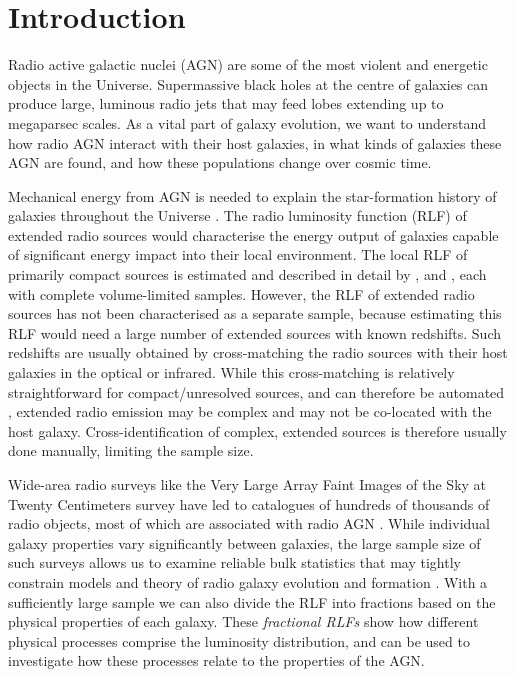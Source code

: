 \documentclass[11pt, a4paper]{book}
\newcommand{\defn}[1]{\emph{#1}}
\begin{document}
\section{Introduction} \label{sec:rlfs-intro}

Radio active galactic nuclei (AGN) are some of the most violent and energetic
objects in the Universe. Supermassive black holes at the centre of galaxies
can produce large, luminous radio jets that may feed lobes extending up to
megaparsec scales. As a vital part of galaxy evolution, we want to understand
how radio AGN interact with their host galaxies, in what kinds of galaxies
these AGN are found, and how these populations change over cosmic time.

Mechanical energy from AGN is needed to explain the star-formation history of galaxies throughout the Universe \citep[e.g.][]{raouf17agn,hardcastle20feedback}. The radio luminosity function (RLF) of extended radio sources would characterise the energy output of galaxies capable of significant energy impact into their local environment. The local RLF of primarily compact sources is estimated and
described in detail by \citet{mauch07rlf}, \citet{pracy16rlf} and
\citet{condon19rlf}, each with complete volume-limited samples. However, the RLF of extended radio sources has not been
characterised as a separate sample, because estimating this RLF would need a large number of extended sources with known
redshifts. Such redshifts are usually obtained by cross-matching the radio
sources with their host galaxies in the optical or infrared. While this
cross-matching is relatively straightforward for compact/unresolved sources,
and can therefore be automated \citep[e.g.][]{kimball08}, extended radio
emission may be complex and may not be co-located with the host galaxy.
Cross-identification of complex, extended sources is therefore usually done
manually, limiting the sample size.

Wide-area radio surveys like the Very Large Array Faint Images of the Sky at
Twenty Centimeters survey \citep[FIRST;][]{white97first} have led to
catalogues of hundreds of thousands of radio objects, most of which are
associated with radio AGN \citep{sadler02rlf}. While individual galaxy
properties vary significantly between galaxies, the large sample size of
such surveys allows us to examine reliable bulk statistics that may
tightly constrain models and theory of radio galaxy evolution and formation \citep{condon92radio}. With a
sufficiently large sample \citep[of size $N$ such that $N \gg
\sqrt{N}$;][]{condon91rlf} we can also divide the RLF into fractions based
on the physical properties of each galaxy. These \defn{fractional RLFs} show
how different physical processes comprise the luminosity distribution, and
can be used to investigate how these processes relate to the properties of
the AGN.
\end{document}
